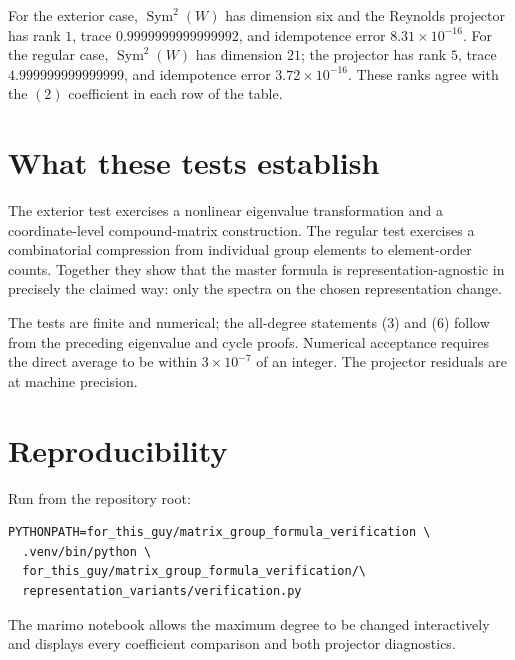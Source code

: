 \documentclass[11pt]{article}
\newcommand{\Sym}{\operatorname{Sym}}
\begin{document}
For the exterior case, $\Sym^2(W)$ has dimension six and the Reynolds
projector has rank $1$, trace $0.9999999999999992$, and idempotence error
$8.31\times10^{-16}$.  For the regular case, $\Sym^2(W)$ has dimension $21$;
the projector has rank $5$, trace $4.999999999999999$, and idempotence error
$3.72\times10^{-16}$.  These ranks agree with the $(2)$ coefficient in each
row of the table.

\section{What these tests establish}

The exterior test exercises a nonlinear eigenvalue transformation and a
coordinate-level compound-matrix construction.  The regular test exercises a
combinatorial compression from individual group elements to element-order
counts.  Together they show that the master formula is representation-agnostic
in precisely the claimed way: only the spectra on the chosen representation
change.

The tests are finite and numerical; the all-degree statements (3) and (6)
follow from the preceding eigenvalue and cycle proofs.  Numerical acceptance
requires the direct average to be within $3\times10^{-7}$ of an integer.  The
projector residuals are at machine precision.

\section{Reproducibility}

Run from the repository root:
\begin{verbatim}
PYTHONPATH=for_this_guy/matrix_group_formula_verification \
  .venv/bin/python \
  for_this_guy/matrix_group_formula_verification/\
  representation_variants/verification.py
\end{verbatim}
The marimo notebook allows the maximum degree to be changed interactively and
displays every coefficient comparison and both projector diagnostics.
\end{document}
